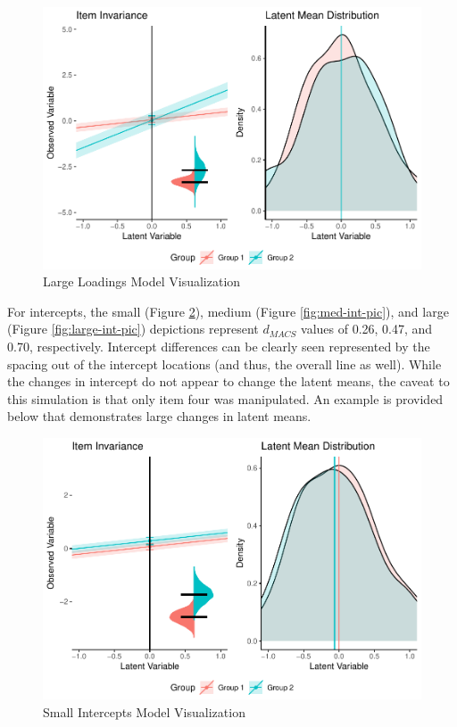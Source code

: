 \documentclass[
  man]{apa7}
\begin{document}
\begin{figure}
\centering
\includegraphics{manuscript_files/figure-latex/large-load-pic-1.pdf}
\caption{\label{fig:large-load-pic}Large Loadings Model Visualization}
\end{figure}

For intercepts, the small (Figure \ref{fig:small-int-pic}), medium (Figure \ref{fig:med-int-pic}), and large (Figure \ref{fig:large-int-pic}) depictions represent \(d_{MACS}\) values of 0.26, 0.47, and 0.70, respectively. Intercept differences can be clearly seen represented by the spacing out of the intercept locations (and thus, the overall line as well). While the changes in intercept do not appear to change the latent means, the caveat to this simulation is that only item four was manipulated. An example is provided below that demonstrates large changes in latent means.

\begin{figure}
\centering
\includegraphics{manuscript_files/figure-latex/small-int-pic-1.pdf}
\caption{\label{fig:small-int-pic}Small Intercepts Model Visualization}
\end{figure}
\end{document}
